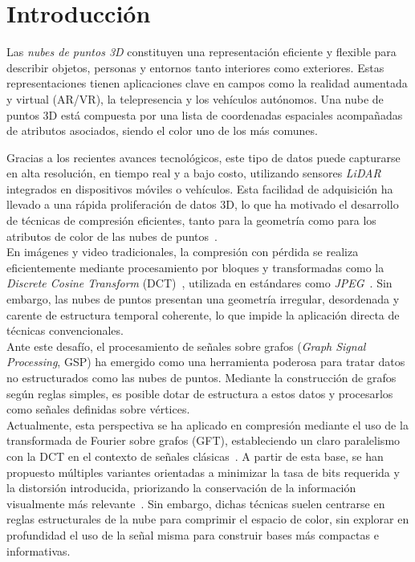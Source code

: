\chapter{Introducción}

Las \textit{nubes de puntos 3D} constituyen una representación eficiente y flexible para describir objetos, personas y entornos tanto interiores como exteriores. Estas representaciones tienen aplicaciones clave en campos como la realidad aumentada y virtual (AR/VR), la telepresencia y los vehículos autónomos. Una nube de puntos 3D está compuesta por una lista de coordenadas espaciales acompañadas de atributos asociados, siendo el color uno de los más comunes.

Gracias a los recientes avances tecnológicos, este tipo de datos puede capturarse en alta resolución, en tiempo real y a bajo costo, utilizando sensores \textit{LiDAR} integrados en dispositivos móviles o vehículos. Esta facilidad de adquisición ha llevado a una rápida proliferación de datos 3D, lo que ha motivado el desarrollo de técnicas de compresión eficientes, tanto para la geometría como para los atributos de color de las nubes de puntos~.
\\

En imágenes y video tradicionales, la compresión con pérdida se realiza eficientemente mediante procesamiento por bloques y transformadas como la \textit{Discrete Cosine Transform} (DCT)~, utilizada en estándares como \textit{JPEG}~. Sin embargo, las nubes de puntos presentan una geometría irregular, desordenada y carente de estructura temporal coherente, lo que impide la aplicación directa de técnicas convencionales.
\\

Ante este desafío, el procesamiento de señales sobre grafos (\textit{Graph Signal Processing}, GSP) ha emergido como una herramienta poderosa para tratar datos no estructurados como las nubes de puntos. Mediante la construcción de grafos según reglas simples, es posible dotar de estructura a estos datos y procesarlos como señales definidas sobre vértices.
\\

Actualmente, esta perspectiva se ha aplicado en compresión mediante el uso de la transformada de Fourier sobre grafos (GFT), estableciendo un claro paralelismo con la DCT en el contexto de señales clásicas~. A partir de esta base, se han propuesto múltiples variantes orientadas a minimizar la tasa de bits requerida y la distorsión introducida, priorizando la conservación de la información visualmente más relevante~. Sin embargo, dichas técnicas suelen centrarse en reglas estructurales de la nube para comprimir el espacio de color, sin explorar en profundidad el uso de la señal misma para construir bases más compactas e informativas.
\\

